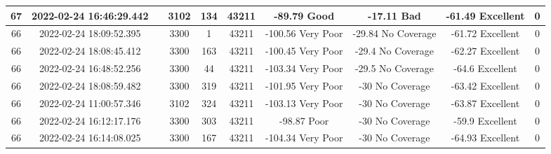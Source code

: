 \begin{longtable*}{|c|c|c|c|c|c|c|c|c|c|}
67&2022-02-24 16:46:29.442&&3102&134&43211& -89.79    Good        & -17.11    Bad         & -61.49    Excellent   & 0\\\hline
{}66&2022-02-24 18:09:52.395&&3300&1&43211& -100.56   Very Poor   & -29.84    No Coverage & -61.72    Excellent   & 0\\\hline
{}66&2022-02-24 18:08:45.412&&3300&163&43211& -100.45   Very Poor   & -29.4     No Coverage & -62.27    Excellent   & 0\\\hline
{}66&2022-02-24 16:48:52.256&&3300&44&43211& -103.34   Very Poor   & -29.5     No Coverage & -64.6     Excellent   & 0\\\hline
{}66&2022-02-24 18:08:59.482&&3300&319&43211& -101.95   Very Poor   & -30       No Coverage & -63.42    Excellent   & 0\\\hline
{}66&2022-02-24 11:00:57.346&&3102&324&43211& -103.13   Very Poor   & -30       No Coverage & -63.87    Excellent   & 0\\\hline
{}66&2022-02-24 16:12:17.176&&3300&303&43211& -98.87    Poor        & -30       No Coverage & -59.9     Excellent   & 0\\\hline
{}66&2022-02-24 16:14:08.025&&3300&167&43211& -104.34   Very Poor   & -30       No Coverage & -64.93    Excellent   & 0\\\hline

\end{longtable*}
